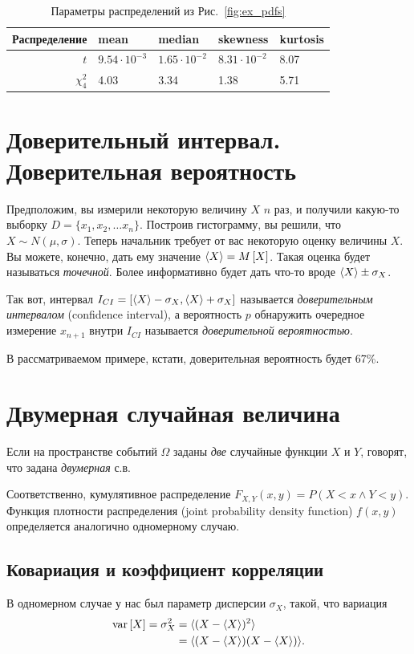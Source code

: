 \documentclass{report}
\newcommand{\var}[1]{\mathrm{var}\left[{#1}\right]}
\begin{document}
\begin{table}
	\caption{Параметры распределений из Рис.~\ref{fig:ex_pdfs}\label{tbl:ex_pdfs}}
	\begin{tabular}{r|l|l|l|l}\hline
		Распределение & mean & median & skewness & kurtosis \\\hline
		$t$ & $9.54\cdot 10^{-3}$ & $1.65\cdot 10^{-2}$ & $8.31\cdot 10^{-2}$ & 8.07\\
		$\chi^2_4$ & 4.03 & 3.34 & 1.38 & 5.71 \\\hline
	\end{tabular}
\end{table}

\section{Доверительный интервал. Доверительная вероятность}
Предположим, вы измерили некоторую величину $X$ $n$ раз, и получили какую-то выборку $D = \{x_1, x_2, \dots x_n\}$. Построив гистограмму, вы решили, что  $X\sim N(\mu, \sigma)$. Теперь начальник требует от вас некоторую оценку величины $X$. Вы можете, конечно, дать ему значение $\langle{X}\rangle = M\left[X\right]$. Такая оценка будет называться \emph{точечной}. Более информативно будет дать что-то вроде $\langle{X}\rangle \pm \sigma_X$.

Так вот, интервал $I_{CI} = \left[\langle{X}\rangle - \sigma_X, \langle{X}\rangle + \sigma_X\right]$ называется \emph{доверительным интервалом} (confidence interval), а вероятность $p$ обнаружить очередное измерение $x_{n+1}$ внутри $I_{CI}$
называется \emph{доверительной вероятностью}. 
\begin{rmk}
	В рассматриваемом примере, кстати, доверительная вероятность будет 67\%.
\end{rmk}

\section{Двумерная случайная величина}
Если на пространстве событий $\Omega$ заданы \emph{две} случайные функции $X$ и $Y$, говорят, что задана \emph{двумерная} с.в.

Соответственно, кумулятивное распределение ${F_{X,Y}(x,y) = P(X<x\wedge Y<y)}$. Функция плотности распределения (joint probability density function) $f(x,y)$ определяется аналогично одномерному случаю.

\subsection{Ковариация и коэффициент корреляции}
В одномерном случае у нас был параметр дисперсии $\sigma_X$, такой, что вариация 
\begin{align*}
\var{X} = \sigma^2_X &= \avg{(X-\avg{X})^2} \\
 &= \avg{(X-\avg{X})(X-\avg{X})}.
\end{align*}
\end{document}
